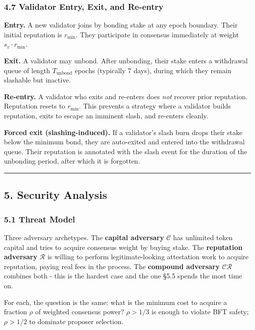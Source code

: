 \documentclass[
  11pt,
]{article}
\begin{document}
\subsubsection{4.7 Validator Entry, Exit, and
Re-entry}\label{validator-entry-exit-and-re-entry}

\textbf{Entry.} A new validator joins by bonding stake at any epoch
boundary. Their initial reputation is \(r_{\min}\). They participate in
consensus immediately at weight \(s_v \cdot r_{\min}\).

\textbf{Exit.} A validator may unbond. After unbonding, their stake
enters a withdrawal queue of length \(T_{\text{unbond}}\) epochs
(typically 7 days), during which they remain slashable but inactive.

\textbf{Re-entry.} A validator who exits and re-enters does \emph{not}
recover prior reputation. Reputation resets to \(r_{\min}\). This
prevents a strategy where a validator builds reputation, exits to escape
an imminent slash, and re-enters cleanly.

\textbf{Forced exit (slashing-induced).} If a validator's slash burn
drops their stake below the minimum bond, they are auto-exited and
entered into the withdrawal queue. Their reputation is annotated with
the slash event for the duration of the unbonding period, after which it
is forgotten.

\begin{center}\rule{0.5\linewidth}{0.5pt}\end{center}

\subsection{5. Security Analysis}\label{security-analysis}

\subsubsection{5.1 Threat Model}\label{threat-model}

Three adversary archetypes. The \textbf{capital adversary}
\(\mathcal{C}\) has unlimited token capital and tries to acquire
consensus weight by buying stake. The \textbf{reputation adversary}
\(\mathcal{R}\) is willing to perform legitimate-looking attestation
work to acquire reputation, paying real fees in the process. The
\textbf{compound adversary} \(\mathcal{CR}\) combines both - this is the
hardest case and the one §5.5 spends the most time on.

For each, the question is the same: what is the minimum cost to acquire
a fraction \(\rho\) of weighted consensus power? \(\rho > 1/3\) is
enough to violate BFT safety; \(\rho > 1/2\) to dominate proposer
selection.
\end{document}
